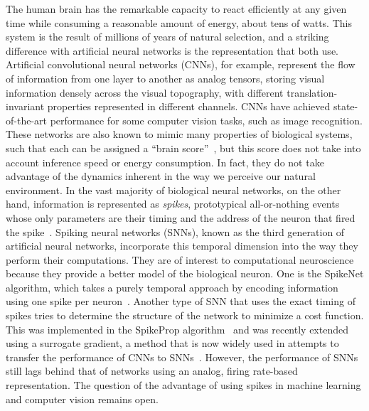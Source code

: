 \documentclass[default]{sn-jnl}%
\theoremstyle{thmstyleone}%
\theoremstyle{thmstyletwo}%
\theoremstyle{thmstylethree}%
\begin{document}
The human brain has the remarkable capacity to react efficiently at any given time while consuming a reasonable amount of energy, about tens of watts. This system is the result of millions of years of natural selection, and a striking difference with artificial neural networks is the representation that both use. Artificial convolutional neural networks (CNNs), for example, represent the flow of information from one layer to another as analog tensors, storing visual information densely across the visual topography, with different translation-invariant properties represented in different channels. CNNs have achieved state-of-the-art performance for some computer vision tasks, such as image recognition. These networks are also known to mimic many properties of biological systems, such that each can be assigned a ``brain score''~\citep{schrimpf_brain-score_2020}, but this score does not take into account inference speed or energy consumption. In fact, they do not take advantage of the dynamics inherent in the way we perceive our natural environment. In the vast majority of biological neural networks, on the other hand, information is represented as \emph{spikes}, prototypical all-or-nothing events whose only parameters are their timing and the address of the neuron that fired the spike~\citep{paugam-moisy_computing_2012}. Spiking neural networks (SNNs), known as the third generation of artificial neural networks, incorporate this temporal dimension into the way they perform their computations. They are of interest to computational neuroscience because they provide a better model of the biological neuron. One is the SpikeNet algorithm, which takes a purely temporal approach by encoding information using one spike per neuron~\citep{delorme_spikenet_1999}. Another type of SNN that uses the exact timing of spikes tries to determine the structure of the network to minimize a cost function. This was implemented in the SpikeProp algorithm~\citep{bohte_error-backpropagation_2002} and was recently extended using a surrogate gradient, a method that is now widely used in attempts to transfer the performance of CNNs to SNNs~\citep{zenke_remarkable_2021}. However, the performance of SNNs still lags behind that of networks using an analog, firing rate-based representation. The question of the advantage of using spikes in machine learning and computer vision remains open.
\end{document}
